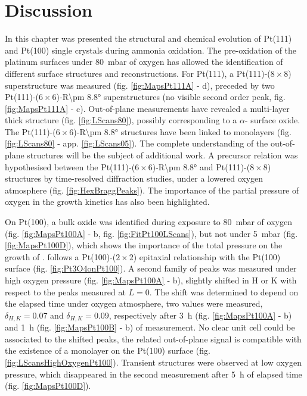 \section{Discussion}

In this chapter was presented the structural and chemical evolution of Pt(111) and Pt(100) single crystals during ammonia oxidation.
The pre-oxidation of the platinum surfaces under \qty{80}{\milli\bar} of oxygen has allowed the identification of different surface structures and reconstructions.
For Pt(111), a Pt(111)-($8\times8$) superstructure was measured (fig. \ref{fig:MapsPt111A} - d), preceded by two Pt(111)-($6\times6$)-R\ang{\pm 8.8} superstructures (no visible second order peak, fig. \ref{fig:MapsPt111A} - c).
Out-of-plane measurements have revealed a multi-layer thick structure (fig. \ref{fig:LScans80}), possibly corresponding to a $\alpha$- surface oxide.
The Pt(111)-($6\times6$)-R\ang{\pm 8.8} structures have been linked to monolayers (fig. \ref{fig:LScans80} - app. \ref{fig:LScans05}).
The complete understanding of the out-of-plane structures will be the subject of additional work.
A precursor relation was hypothesised between the Pt(111)-($6\times6$)-R\ang{\pm 8.8} and Pt(111)-($8\times8$) structures by time-resolved diffraction studies, under a lowered oxygen atmosphere (fig. \ref{fig:HexBraggPeaks}).
The importance of the partial pressure of oxygen in the growth kinetics has also been highlighted.

On Pt(100), a bulk  oxide was identified during exposure to \qty{80}{\milli\bar} of oxygen (fig. \ref{fig:MapsPt100A} - b, fig. \ref{fig:FitPt100LScans}), but not under \qty{5}{\milli\bar} (fig. \ref{fig:MapsPt100D}), which shows the importance of the total pressure on the growth of .
 follows a Pt(100)-($2\times2$) epitaxial relationship with the Pt(100) surface (fig. \ref{fig:Pt3O4onPt100}).
A second family of peaks was measured under high oxygen pressure (fig. \ref{fig:MapsPt100A} - b), slightly shifted in H or K with respect to the  peaks measured at $L=0$.
The shift was determined to depend on the elapsed time under oxygen atmosphere, two values were measured, $\delta_{H,K}=0.07$ and $\delta_{H,K}=0.09$, respectively after \qty{3}{\hour} (fig. \ref{fig:MapsPt100A} - b) and \qty{1}{\hour} (fig. \ref{fig:MapsPt100B} - b) of measurement.
No clear unit cell could be associated to the shifted peaks, the related out-of-plane signal is compatible with the existence of a monolayer on the Pt(100) surface (fig. \ref{fig:LScansHighOxygenPt100}).
Transient structures were observed at low oxygen pressure, which disappeared in the second measurement after \qty{5}{\hour} of elapsed time (fig. \ref{fig:MapsPt100D}).

